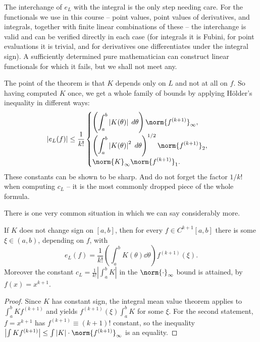 \documentclass[a4paper]{scrartcl}
\providecommand{\abs}[1]{\left\lvert#1\right\rvert}
\renewcommand{\abs}[1]{\left\lvert#1\right\rvert}
\begin{document}
\begin{remark}
  The interchange of $e_L$ with the integral is the only step needing care. For the functionals we use in this course -- point values, point values of derivatives, and integrals, together with finite linear combinations of these -- the interchange is valid and can be verified directly in each case (for integrals it is Fubini, for point evaluations it is trivial, and for derivatives one differentiates under the integral sign). A sufficiently determined pure mathematician can construct linear functionals for which it fails, but we shall not meet any.
\end{remark}

The point of the theorem is that $K$ depends only on $L$ and not at all on $f$. So having computed $K$ once, we get a whole family of bounds by applying Hölder's inequality in different ways:
$$
\abs{e_L(f)} \leq \frac{1}{k!}\begin{cases}
\displaystyle \left(\int_a^b\abs{K(\theta)}\dd\theta\right)\norm{f^{(k+1)}}_\infty,\\[2ex]
\displaystyle \left(\int_a^b \abs{K(\theta)}^2\dd\theta\right)^{1/2}\norm{f^{(k+1)}}_2,\\[2ex]
\displaystyle \norm{K}_\infty \norm{f^{(k+1)}}_1 .
\end{cases}
$$
These constants can be shown to be sharp. And do not forget the factor $1/k!$ when computing $c_L$ -- it is the most commonly dropped piece of the whole formula.

There is one very common situation in which we can say considerably more.

\begin{proposition}\label{prop:signdef}
  If $K$ does not change sign on $[a,b]$, then for every $f \in C^{k+1}[a,b]$ there is some $\xi \in (a,b)$, depending on $f$, with
  $$
  e_L(f) = \frac{1}{k!}\left(\int_a^b K(\theta)\dd\theta\right)f^{(k+1)}(\xi).
  $$
  Moreover the constant $c_L = \frac{1}{k!}\abs{\int_a^b K}$ in the $\norm{\cdot}_\infty$ bound is attained, by $f(x) = x^{k+1}$.
\end{proposition}
\begin{proof}
  Since $K$ has constant sign, the integral mean value theorem applies to $\int_a^b K f^{(k+1)}$ and yields $f^{(k+1)}(\xi)\int_a^b K$ for some $\xi$. For the second statement, $f = x^{k+1}$ has $f^{(k+1)} \equiv (k+1)!$ constant, so the inequality $\abs{\int K f^{(k+1)}}\le \int\abs{K}\cdot\norm{f^{(k+1)}}_\infty$ is an equality.
\end{proof}
\end{document}
